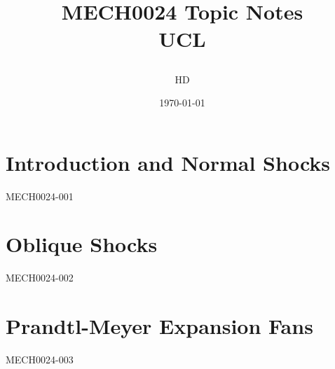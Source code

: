 \documentclass[12pt,a4paper, twoside]{report}
\begin{document}
\title{
{MECH0024 Topic Notes}\\
{\large UCL}
\author{HD}
\date{\today}
}
\maketitle
\tableofcontents
\chapter{Introduction and Normal Shocks}
{MECH0024-001}
\chapter{Oblique Shocks}
{MECH0024-002}
\chapter{Prandtl-Meyer Expansion Fans}
{MECH0024-003}
\end{document}
